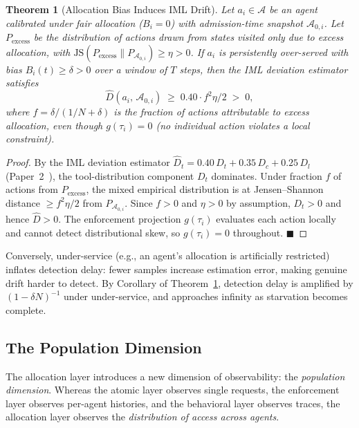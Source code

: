\documentclass[11pt]{article}
\newtheorem{theorem}{Theorem}[section]
\newcommand{\Agents}{\mathcal{A}}
\newcommand{\Azeroi}[1]{\mathcal{A}_{0,#1}}   %
\newcommand{\Dhat}{\widehat{D}}
\begin{document}
\begin{theorem}[Allocation Bias Induces IML Drift]
\label{thm:bias-drift}
Let $a_i \in \Agents$ be an agent calibrated under fair allocation ($B_i = 0$) with
admission-time snapshot $\Azeroi{i}$. Let $P_{\mathrm{excess}}$ be the distribution of
actions drawn from states visited only due to excess allocation, with
$\mathrm{JS}(P_{\mathrm{excess}} \| P_{\Azeroi{i}}) \geq \eta > 0$. If $a_i$ is
persistently over-served with bias $B_i(t) \geq \delta > 0$ over a window of $T$ steps,
then the IML deviation estimator satisfies
\[
  \widehat{D}(a_i,\,\Azeroi{i}) \;\geq\; 0.40 \cdot f^2 \eta / 2 \;>\; 0,
\]
where $f = \delta/(1/N + \delta)$ is the fraction of actions attributable to excess
allocation, even though $g(\tau_i) = 0$ (no individual action violates a local constraint).
\end{theorem}

\begin{proof}
By the IML deviation estimator $\Dhat_t = 0.40\,D_t + 0.35\,D_c + 0.25\,D_l$
(Paper~2~\cite{fernandez2026c}), the tool-distribution component $D_t$ dominates.
Under fraction $f$ of actions from $P_{\mathrm{excess}}$, the mixed empirical distribution
is at Jensen--Shannon distance $\geq f^2 \eta / 2$ from $P_{\Azeroi{i}}$. Since $f > 0$
and $\eta > 0$ by assumption, $D_t > 0$ and hence $\Dhat > 0$. The enforcement
projection $g(\tau_i)$ evaluates each action locally and cannot detect distributional
skew, so $g(\tau_i) = 0$ throughout. \hfill $\blacksquare$
\end{proof}

Conversely, under-service (e.g., an agent's allocation is artificially restricted) inflates
detection delay: fewer samples increase estimation error, making genuine drift harder to
detect. By Corollary of Theorem~\ref{thm:bias-drift}, detection delay is amplified by
$(1 - \delta N)^{-1}$ under under-service, and approaches infinity as starvation becomes
complete.

\subsection{The Population Dimension}

The allocation layer introduces a new dimension of observability: the \emph{population dimension}. Whereas the atomic layer observes single requests, the enforcement layer observes per-agent histories, and the behavioral layer observes traces, the allocation layer observes the \emph{distribution of access across agents}.
\end{document}
